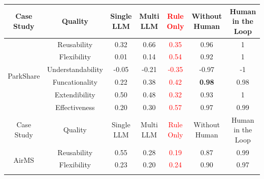 \documentclass[pdflatex,sn-mathphys-num]{sn-jnl}%
\theoremstyle{thmstyleone}%
\theoremstyle{thmstyletwo}%
\theoremstyle{thmstylethree}%
\begin{document}
\begin{table}[!htb]
{\begin{threeparttable}
\begin{tabular}{|c|c|cc|c|cc|}
Case Study                  & Quality                  & \multicolumn{1}{c|}{Single LLM}     & Multi LLM      & \multicolumn{1}{c|}{\textcolor{red}{Rule Only}} & \multicolumn{1}{c|}{Without Human} & Human in the Loop \\ \hline
\multirow{6}{*}{ParkShare}  & Reusability              & \multicolumn{1}{c|}{0.32}           & 0.66           & \multicolumn{1}{c|}{\textcolor{red}{0.35}}          & \multicolumn{1}{c|}{0.96}          & 1                 \\ \cline{2-7} 
                            & Flexibility              & \multicolumn{1}{c|}{0.01}           & 0.14           & \multicolumn{1}{c|}{\textcolor{red}{0.54}}          & \multicolumn{1}{c|}{0.92}          & 1                 \\ \cline{2-7} 
                            & Understandability        & \multicolumn{1}{c|}{-0.05} & -0.21          & \multicolumn{1}{c|}{\textcolor{red}{-0.35}}          & \multicolumn{1}{c|}{-0.97}         & -1                \\ \cline{2-7} 
                            & Funcationality           & \multicolumn{1}{c|}{0.22}           & 0.38           & \multicolumn{1}{c|}{\textcolor{red}{0.42}}          & \multicolumn{1}{c|}{\textbf{0.98}}          & 0.98              \\ \cline{2-7} 
                            & Extendibility            & \multicolumn{1}{c|}{0.50}           & 0.48           & \multicolumn{1}{c|}{\textcolor{red}{0.32}}          & \multicolumn{1}{c|}{0.93}          & 1                 \\ \cline{2-7} 
                            & Effectiveness            & \multicolumn{1}{c|}{0.20}           & 0.30           & \multicolumn{1}{c|}{\textcolor{red}{0.57}}          & \multicolumn{1}{c|}{0.97}          & 0.99              \\ \hline
Case Study                  & Quality                  & \multicolumn{1}{c|}{Single LLM}     & Multi LLM      & \multicolumn{1}{c|}{\textcolor{red}{Rule Only}} & \multicolumn{1}{c|}{Without Human} & Human in the Loop \\ \hline
\multirow{6}{*}{AirMS}      & Reusability              & \multicolumn{1}{c|}{0.55}           & 0.28           & \multicolumn{1}{c|}{\textcolor{red}{0.19}}          & \multicolumn{1}{c|}{0.87}          & 0.99              \\ \cline{2-7} 
                            & Flexibility              & \multicolumn{1}{c|}{0.23}           & 0.20           & \multicolumn{1}{c|}{\textcolor{red}{0.24}}          & \multicolumn{1}{c|}{0.90}           & 0.97              \\ \cline{2-7} 

\end{tabular}
\end{threeparttable}}
\end{table}
\end{document}

